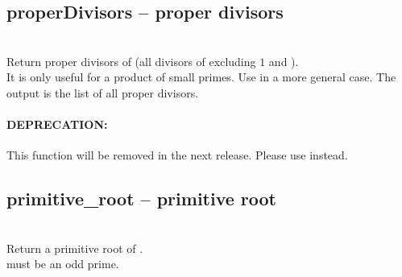  \subsection{properDivisors -- proper divisors}
   {}{}\\
   \spacing
   \quad Return proper divisors of  (all divisors of  excluding $1$ and ).\\
   \spacing
   \quad  It is only useful for a product of small primes.
   Use  in a more
   general case.
   \spacing
   \quad The output is the list of all proper divisors.\\
   \paragraph{DEPRECATION:} This function will be removed in the next release.
   Please use  instead.\\
%
 \subsection{primitive\_root -- primitive root}
   {}{}\\
   \spacing
   \quad Return a primitive root of .\\
   \spacing
   \quad {} must be an odd prime.
%
